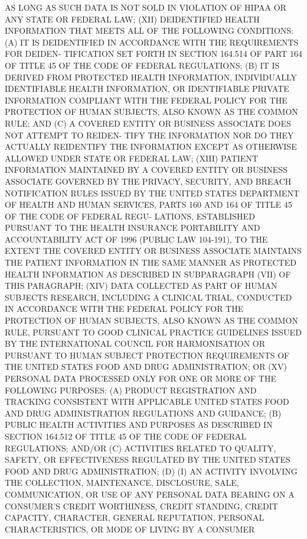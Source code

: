  AS  LONG  AS SUCH DATA IS NOT SOLD IN VIOLATION OF HIPAA OR ANY STATE OR
 FEDERAL LAW;
   (XII)  DEIDENTIFIED HEALTH INFORMATION THAT MEETS ALL OF THE FOLLOWING
 CONDITIONS:
   (A) IT IS DEIDENTIFIED IN ACCORDANCE WITH THE REQUIREMENTS FOR DEIDEN-
 TIFICATION SET FORTH IN SECTION 164.514 OF PART 164 OF TITLE 45  OF  THE
 CODE OF FEDERAL REGULATIONS;
   (B)  IT  IS  DERIVED  FROM  PROTECTED HEALTH INFORMATION, INDIVIDUALLY
 IDENTIFIABLE HEALTH INFORMATION,  OR  IDENTIFIABLE  PRIVATE  INFORMATION
 COMPLIANT  WITH THE FEDERAL POLICY FOR THE PROTECTION OF HUMAN SUBJECTS,
 ALSO KNOWN AS THE COMMON RULE; AND
   (C) A COVERED ENTITY OR BUSINESS ASSOCIATE DOES NOT ATTEMPT TO REIDEN-
 TIFY THE INFORMATION NOR DO THEY  ACTUALLY  REIDENTIFY  THE  INFORMATION
 EXCEPT AS OTHERWISE ALLOWED UNDER STATE OR FEDERAL LAW;
   (XIII)  PATIENT INFORMATION MAINTAINED BY A COVERED ENTITY OR BUSINESS
 ASSOCIATE GOVERNED BY THE PRIVACY,  SECURITY,  AND  BREACH  NOTIFICATION
 RULES  ISSUED  BY  THE  UNITED  STATES  DEPARTMENT  OF  HEALTH AND HUMAN
 SERVICES, PARTS 160 AND 164 OF TITLE 45 OF THE  CODE  OF  FEDERAL  REGU-
 LATIONS,  ESTABLISHED  PURSUANT  TO THE HEALTH INSURANCE PORTABILITY AND
 ACCOUNTABILITY ACT OF 1996 (PUBLIC  LAW  104-191),  TO  THE  EXTENT  THE
 COVERED  ENTITY  OR BUSINESS ASSOCIATE MAINTAINS THE PATIENT INFORMATION
 IN THE SAME MANNER AS  PROTECTED  HEALTH  INFORMATION  AS  DESCRIBED  IN
 SUBPARAGRAPH (VII) OF THIS PARAGRAPH;
   (XIV)  DATA  COLLECTED AS PART OF HUMAN SUBJECTS RESEARCH, INCLUDING A
 CLINICAL TRIAL, CONDUCTED IN ACCORDANCE WITH THE FEDERAL POLICY FOR  THE
 PROTECTION OF HUMAN SUBJECTS, ALSO KNOWN AS THE COMMON RULE, PURSUANT TO
 GOOD  CLINICAL  PRACTICE  GUIDELINES ISSUED BY THE INTERNATIONAL COUNCIL
 FOR HARMONISATION OR PURSUANT TO HUMAN SUBJECT  PROTECTION  REQUIREMENTS
 OF THE UNITED STATES FOOD AND DRUG ADMINISTRATION; OR
   (XV)  PERSONAL  DATA  PROCESSED  ONLY FOR ONE OR MORE OF THE FOLLOWING
 PURPOSES:
   (A) PRODUCT  REGISTRATION  AND  TRACKING  CONSISTENT  WITH  APPLICABLE
 UNITED STATES FOOD AND DRUG ADMINISTRATION REGULATIONS AND GUIDANCE;
   (B)  PUBLIC  HEALTH  ACTIVITIES  AND  PURPOSES AS DESCRIBED IN SECTION
 164.512 OF TITLE 45 OF THE CODE OF FEDERAL REGULATIONS; AND/OR
   (C) ACTIVITIES RELATED TO QUALITY, SAFETY, OR EFFECTIVENESS  REGULATED
 BY THE UNITED STATES FOOD AND DRUG ADMINISTRATION;
   (D) (I) AN ACTIVITY INVOLVING THE COLLECTION, MAINTENANCE, DISCLOSURE,
 SALE, COMMUNICATION, OR USE OF ANY PERSONAL DATA BEARING ON A CONSUMER'S
 CREDIT  WORTHINESS, CREDIT STANDING, CREDIT CAPACITY, CHARACTER, GENERAL
 REPUTATION, PERSONAL CHARACTERISTICS, OR MODE OF LIVING  BY  A  CONSUMER
